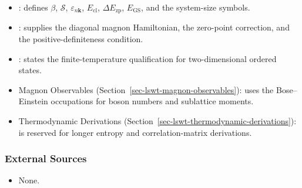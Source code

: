 \begin{itemize}
\tightlist
\item
  : defines \(\beta\), \(\mathcal S\), \(\varepsilon_{n\mathbf k}\), \(E_{\mathrm{cl}}\), \(\Delta E_{\mathrm{zp}}\), \(E_{\mathrm{GS}}\), and the system-size symbols.
\item
  : supplies the diagonal magnon Hamiltonian, the zero-point correction, and the positive-definiteness condition.
\item
  : states the finite-temperature qualification for two-dimensional ordered states.
\item
  Magnon Observables (Section~\ref{sec-lswt-magnon-observables}): uses the Bose--Einstein occupations for boson numbers and sublattice moments.
\item
  Thermodynamic Derivations (Section~\ref{sec-lswt-thermodynamic-derivations}): is reserved for longer entropy and correlation-matrix derivations.
\end{itemize}

\subsubsection{External Sources}

\begin{itemize}
\tightlist
\item
  None.
\end{itemize}
